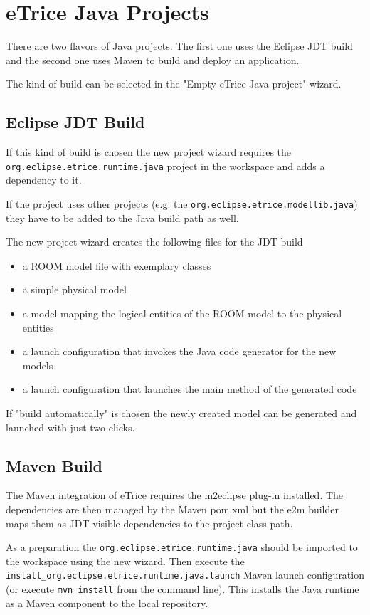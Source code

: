 \section{eTrice Java Projects}

There are two flavors of \eTrice{} Java projects. The first one uses the Eclipse JDT build and the
second one uses Maven to build and deploy an \eTrice{} application.

The kind of build can be selected in the "Empty eTrice Java project" wizard.

\subsection{Eclipse JDT Build}

If this kind of build is chosen the \eTrice{} new project wizard requires the \texttt{org.eclipse.etrice.runtime.java}
project in the workspace and adds a dependency to it.

If the project uses other \eTrice{} projects (e.g. the \texttt{org.eclipse.etrice.modellib.java})
they have to be added to the Java build path as well.

The \eTrice{} new project wizard creates the following files for the JDT build
\begin{itemize}
\item a ROOM model file with exemplary classes
\item a simple physical model
\item a model mapping the logical entities of the ROOM model to the physical entities
\item a launch configuration that invokes the \eTrice{} Java code generator for the new models
\item a launch configuration that launches the main method of the generated code
\end{itemize}

If "build automatically" is chosen the newly created model can be generated and launched with just two clicks.

\subsection{Maven Build}

The Maven integration of eTrice requires the m2eclipse plug-in installed. The dependencies are then managed
by the Maven pom.xml but the e2m builder maps them as JDT visible dependencies to the project class path.

As a preparation the \texttt{org.eclipse.etrice.runtime.java} should be imported to the workspace
using the \eTrice{} new wizard. Then execute the \texttt{install\_org.eclipse.etrice.runtime.java.launch}
Maven launch configuration (or execute \texttt{mvn install} from the command line). This installs the \eTrice{}
Java runtime as a Maven component to the local repository.

